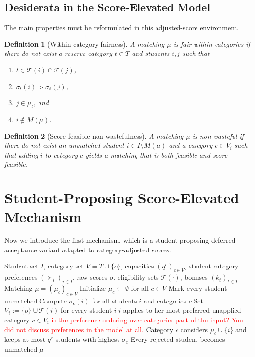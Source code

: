 \documentclass[12pt]{article}
\newtheorem{definition}{Definition}
\newcommand{\T}{\mathcal{T}}
\newcommand{\1}{\mathbf{1}}
\begin{document}
\subsection{Desiderata in the Score-Elevated Model}

The main properties must be reformulated in this adjusted-score environment.

\begin{definition}[Within-category fairness]
A matching $\mu$ is fair within categories if there do not exist a reserve category $t\in T$ and students $i,j$ such that
\begin{enumerate}
\item $t\in\T(i)\cap\T(j)$,
\item $\sigma_t(i)>\sigma_t(j)$,
\item $j\in\mu_t$, and
\item $i\notin M(\mu)$.
\end{enumerate}
\end{definition}

\begin{definition}[Score-feasible non-wastefulness]
A matching $\mu$ is non-wasteful if there do not exist an unmatched student $i\in I\setminus M(\mu)$ and a category $c\in V_i$ such that adding $i$ to category $c$ yields a matching that is both feasible and score-feasible.
\end{definition}

\section{Student-Proposing Score-Elevated Mechanism}
Now we introduce the first mechanism, which is a student-proposing deferred-acceptance variant adapted to category-adjusted scores.

\begin{algorithm}[H]
\caption{Student-Proposing Score-Elevated Mechanism (SPSE)}
\begin{algorithmic}[1]
\Require Student set $I$, category set $V=T\cup\{o\}$, capacities $(q^c)_{c\in V}$, student category preferences $(\succ_i)_{i\in I}$, raw scores $\sigma$, eligibility sets $\T(\cdot)$, bonuses $(k_t)_{t\in T}$
\Ensure Matching $\mu=(\mu_c)_{c\in V}$
\State Initialize $\mu_c\gets\emptyset$ for all $c\in V$
\State Mark every student unmatched
\State Compute $\sigma_c(i)$ for all students $i$ and categories $c$
\State Set $V_i:=\{o\}\cup\T(i)$ for every student $i$
    \State $i$ applies to her most preferred unapplied category $c\in V_i$ 
    \textcolor{red}{is the preference ordering over categories part of the input? You did not discuss preferences in the model at all.}
    \State Category $c$ considers $\mu_c\cup\{i\}$ and keeps at most $q^c$ students with highest $\sigma_c$
    \State Every rejected student becomes unmatched
\EndWhile
\State \Return $\mu$
\end{algorithmic}
\end{algorithm}
\end{document}
